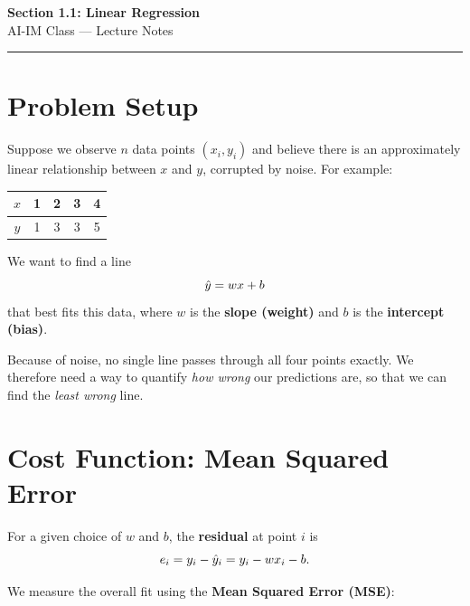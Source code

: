 \documentclass[12pt, a4paper]{article}
\begin{document}
\begin{center}
  {\LARGE \textbf{Section 1.1: Linear Regression}} \\[0.5em]
  {\large AI-IM Class — Lecture Notes}%
  \ifstudentmode
  \fi
\end{center}

\vspace{1em}
\hrule
\vspace{1.5em}

\section{Problem Setup}

Suppose we observe $n$ data points $(x_i, y_i)$ and believe there is an
approximately linear relationship between $x$ and $y$, corrupted by noise.
For example:

\begin{center}
  \begin{tabular}{ccccc}
    \toprule
    $x$ & 1 & 2 & 3 & 4 \\
    \midrule
    $y$ & 1 & 3 & 3 & 5 \\
    \bottomrule
  \end{tabular}
\end{center}

We want to find a line
\[
  \hat{y} = wx + b
\]
that best fits this data, where $w$ is the \textbf{slope (weight)} and $b$
is the \textbf{intercept (bias)}.

Because of noise, no single line passes through all four points exactly.
We therefore need a way to quantify \emph{how wrong} our predictions are, so
that we can find the \emph{least wrong} line.


\section{Cost Function: Mean Squared Error}

For a given choice of $w$ and $b$, the \textbf{residual} at point $i$ is
\[
  e_i = y_i - \hat{y}_i = y_i - wx_i - b.
\]

We measure the overall fit using the \textbf{Mean Squared Error (MSE)}:
\end{document}
